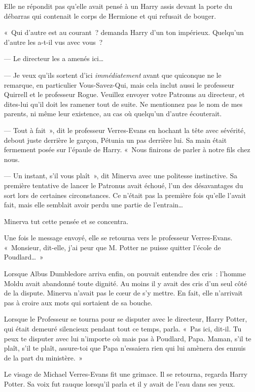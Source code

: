Elle ne répondit pas qu'elle avait pensé à un Harry assis devant la porte du débarras qui contenait le corps de Hermione et qui refusait de bouger.

«~Qui d'autre est au courant~? demanda Harry d'un ton impérieux.
Quelqu'un d'autre les a-t-il vus avec vous~?

--- Le directeur les a amenés ici…

--- Je veux qu'ils sortent d'ici \emph{immédiatement} avant que quiconque ne le remarque, en particulier Vous-Savez-Qui, mais cela inclut aussi le professeur Quirrell et le professeur Rogue.
Veuillez envoyer votre Patronus au directeur, et dites-lui qu'il doit les ramener tout de suite.
Ne mentionnez pas le nom de mes parents, ni même leur existence, au cas où quelqu'un d'autre écouterait.

--- Tout à fait~», dit le professeur Verres-Evans en hochant la tête avec sévérité, debout juste derrière le garçon, Pétunia un pas derrière lui.
Sa main était fermement posée sur l'épaule de Harry.
«~Nous finirons de parler à notre fils chez nous.

--- Un instant, s'il vous plaît~», dit Minerva avec une politesse instinctive.
Sa première tentative de lancer le Patronus avait échoué, l'un des désavantages du sort lors de certaines circonstances.
Ce n'était pas la première fois qu'elle l'avait fait, mais elle semblait avoir perdu une partie de l'entrain…

Minerva tut cette pensée et se concentra.

Une fois le message envoyé, elle se retourna vers le professeur Verres-Evans.
«~Monsieur, dit-elle, j'ai peur que M. Potter ne puisse quitter l'école de Poudlard…~»

Lorsque Albus Dumbledore arriva enfin, on pouvait entendre des cris~: l'homme Moldu avait abandonné toute dignité.
Au moins il y avait des cris d'un seul côté de la dispute.
Minerva n'avait pas le cœur de s'y mettre.
En fait, elle n'arrivait pas à croire aux mots qui sortaient de sa bouche.

Lorsque le Professeur se tourna pour se disputer avec le directeur, Harry Potter, qui était demeuré silencieux pendant tout ce temps, parla.
«~Pas ici, dit-il.
Tu peux te disputer avec lui n'importe où mais pas à Poudlard, Papa.
Maman, s'il te plaît, s'il te plaît, assure-toi que Papa n'essaiera rien qui lui amènera des ennuis de la part du ministère.~»

Le visage de Michael Verres-Evans fit une grimace.
Il se retourna, regarda Harry Potter.
Sa voix fut rauque lorsqu'il parla et il y avait de l'eau dans ses yeux.

